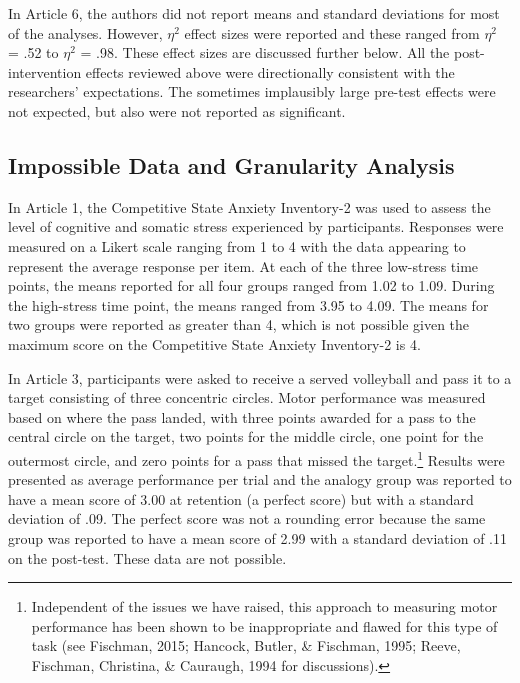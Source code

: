 \documentclass[
  english,
  man, donotrepeattitle,floatsintext]{apa7}
\begin{document}
In Article 6, the authors did not report means and standard deviations for most of the analyses. However, \(\eta^{2}\) effect sizes were reported and these ranged from \(\eta^{2}\) = .52 to \(\eta^{2}\) = .98. These effect sizes are discussed further below. All the post-intervention effects reviewed above were directionally consistent with the researchers' expectations. The sometimes implausibly large pre-test effects were not expected, but also were not reported as significant.

\hypertarget{impossible-data-and-granularity-analysis}{%
\subsection{Impossible Data and Granularity Analysis}\label{impossible-data-and-granularity-analysis}}

In Article 1, the Competitive State Anxiety Inventory-2 was used to assess the level of cognitive and somatic stress experienced by participants. Responses were measured on a Likert scale ranging from 1 to 4 with the data appearing to represent the average response per item. At each of the three low-stress time points, the means reported for all four groups ranged from 1.02 to 1.09. During the high-stress time point, the means ranged from 3.95 to 4.09. The means for two groups were reported as greater than 4, which is not possible given the maximum score on the Competitive State Anxiety Inventory-2 is 4.

In Article 3, participants were asked to receive a served volleyball and pass it to a target consisting of three concentric circles. Motor performance was measured based on where the pass landed, with three points awarded for a pass to the central circle on the target, two points for the middle circle, one point for the outermost circle, and zero points for a pass that missed the target.\footnote{Independent of the issues we have raised, this approach to measuring motor performance has been shown to be inappropriate and flawed for this type of task (see Fischman, 2015; Hancock, Butler, \& Fischman, 1995; Reeve, Fischman, Christina, \& Cauraugh, 1994 for discussions).} Results were presented as average performance per trial and the analogy group was reported to have a mean score of 3.00 at retention (a perfect score) but with a standard deviation of .09. The perfect score was not a rounding error because the same group was reported to have a mean score of 2.99 with a standard deviation of .11 on the post-test. These data are not possible.
\end{document}
